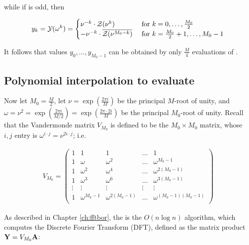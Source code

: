 while if \dBP{\strA}{\strB} is odd, then

\begin{align}
\label{eq:ffttwo:trickForRoU2}
y_k = \emYof{}{\omega^k} =
\begin{cases}
\nu^{-k} \cdot \emZof{}{\nu^k}
& \text{ for } k=0,\dots,\frac{M_0}{2} \\
-\nu^{-k} \cdot \overline{\emZof{}{\nu^{M_0-k}}}
& \text{ for } k=\frac{M_0}{2}+1,\dots,M_0-1 \\
\end{cases}
\end{align}

It follows that values $y_0,\dots,y_{M_0-1}$ can be obtained by only
$\frac{M}{4}$ evaluations of \emZ{}.

\subsection{Polynomial interpolation to evaluate
\texorpdfstring{}{}}
\label{subsec:ffttwo:fft}

Now let $M_0=\frac{M}{2}$, let
$\nu=\exp(\frac{2\pi i}{M})$ be the principal $M$-root of unity, and
$\omega=\nu^2=\exp(\frac{2\pi i}{M/2})=\exp(\frac{2\pi \cdot 2i}{M})$ be
the principal $M_0$-root of unity. Recall that the
Vandermonde matrix $V_{M_0}$ is defined to be the
$M_0 \times M_0$ matrix, whose $i,j$ entry is
$\omega^{i \cdot j} = \nu^{2 i \cdot j}$;
i.e.

\begin{align}
\label{eq:ffttwo:vandermonde}
V_{M_0} = \left(
\begin{array}{rrrrr}
1 & 1 & 1 & \dots & 1 \\
1 & \omega & \omega^2 & \dots & \omega^{M_0-1} \\
1 & \omega^2 & \omega^4 & \dots & \omega^{2(M_0-1)} \\
1 & \omega^3 & \omega^6 & \dots & \omega^{3(M_0-1)} \\
\vdots & \vdots & \vdots & \vdots & \vdots \\
1 & \omega^{M_0-1} & \omega^{2(M_0-1)} & \dots & \omega^{(M_0-1)(M_0-1)} \\
\end{array}
\right)
\end{align}

As described in Chapter \ref{ch:fftbor}, the \fft is the $O(n \log n)$
algorithm, which computes the Discrete Fourier Transform (DFT), defined
as the matrix product ${\bf Y} = V_{M_0} {\bf A}$:

